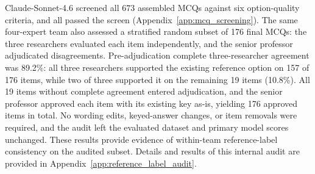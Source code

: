 \documentclass[11pt]{article}
\begin{document}
Claude-Sonnet-4.6 screened all $673$ assembled MCQs against six option-quality criteria, and all passed the screen (Appendix~\ref{app:mcq_screening}). The same four-expert team also assessed a stratified random subset of 176 final MCQs: the three researchers evaluated each item independently, and the senior professor adjudicated disagreements. Pre-adjudication complete three-researcher agreement was 89.2\%: all three researchers supported the existing reference option on 157 of 176 items, while two of three supported it on the remaining 19 items (10.8\%). All 19 items without complete agreement entered adjudication, and the senior professor approved each item with its existing key as-is, yielding 176 approved items in total. No wording edits, keyed-answer changes, or item removals were required, and the audit left the evaluated dataset and primary model scores unchanged. These results provide evidence of within-team reference-label consistency on the audited subset. Details and results of this internal audit are provided in Appendix~\ref{app:reference_label_audit}.
\end{document}

